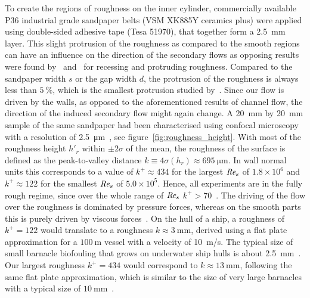 \documentclass[aps,twocolumn,10pt,floatfix, superscriptaddress,longbibliography,pra]{revtex4-1}
\newcommand\Rey{\mbox{\textit{Re$_s$}}}  %
\newcommand{\e}[1]{\times 10^{#1}}
\begin{document}
To create the regions of roughness on the inner cylinder, commercially available P36 industrial grade sandpaper belts (VSM XK885Y ceramics plus) were applied using double-sided adhesive tape (Tesa 51970), that together form a \SI{2.5}{\milli\metre} layer. This slight protrusion of the roughness as compared to the smooth regions can have an influence on the direction of the secondary flows as opposing results were found by~\cite{Mejia2013} and~\cite{Vanderwel2015} for recessing and protruding roughness. Compared to the sandpaper width $s$ or the gap width $d$, the protrusion of the roughness is always less than $\SI{5}{\percent}$, which is the smallest protrusion studied by~\cite{Vanderwel2015}. Since our flow is driven by the walls, as opposed to the aforementioned results of channel flow, the direction of the induced secondary flow might again change. A \SI{20}{mm} by \SI{20}{mm} sample of the same sandpaper had been characterised using confocal microscopy with a resolution of \SI{2.5}{\um}~\citep{Bakhuis2019}, see figure~\ref{fig:roughness_height}. With most of the roughness height $h'_r$ within $\pm 2\sigma$ of the mean, the roughness of the surface is defined as the peak-to-valley distance $k \equiv 4\sigma(h_r) \approx \SI{695}{\um}$. In wall normal units this corresponds to a value of $k^+ \approx 434$ for the largest $\Rey$ of $1.8\e6$ and $k^+ \approx 122$ for the smallest $\Rey$ of $5.0\e5$. Hence, all experiments are in the fully rough regime, since over the whole range of $\Rey$ $k^+ > 70$~\citep{Schlichting}. The driving of the flow over the roughness is dominated by pressure forces, whereas on the smooth parts this is purely driven by viscous forces~\citep{Zhu2017,Zhu2018}. On the hull of a ship, a roughness of $k^+ = 122$ would translate to a roughness $k \approx \SI{3}{\mm}$, derived using a flat plate approximation for a $\SI{100}{\metre}$ vessel with a velocity of \SI{10}{m/s}. The typical size of small barnacle biofouling
that grows on underwater ship hulls is about \SI{2.5}{\mm}~\citep{Schultz2004,Demirel2017,Demirel20172}. Our largest roughness $k^+ = 434$ would correspond to $k \approx \SI{13}{\mm}$, following the same flat plate approximation, which is similar to the size of very large barnacles with a typical size of $\SI{10}{\mm}$~\citep{Schultz2004,Demirel2017,Demirel20172}.
\end{document}

